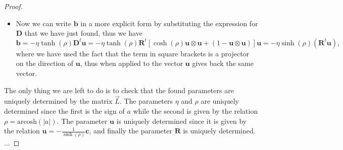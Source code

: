 \begin{proof}
\begin{itemize}
\[              \]
              since we know \(\alpha, \beta \neq 0\). Thus the inverse of the middle term is given by
              \[
                  \left[ 1 - \tanh^2(\rho) \mathbf{u} \otimes \mathbf{u} \right]^{-1} = (1 - \mathbf{u} \otimes \mathbf{u}) + \frac{1}{1 - \tanh^2(\rho)} \mathbf{u} \otimes \mathbf{u} = (1 - \mathbf{u} \otimes \mathbf{u}) + \cosh^2(\rho) \mathbf{u} \otimes \mathbf{u},
              \]
              where we have used the identity \(1 - \tanh^2(\rho) = \frac{1}{\cosh^2(\rho)}\).
              Hence we have
              \[
                  \mathbf{D} \mathbf{D}^t = (1 - \mathbf{u} \otimes \mathbf{u}) + \cosh^2(\rho) \mathbf{u} \otimes \mathbf{u}.
              \]
              It is not difficult to guess a solution for \(\mathbf{D}\) that satisfies this equation: imagine a matrix which has the same structure but different coefficients, which since the proectors are idempotent, when multiplied by its transposition will give the same structure but with the coefficients squared, thus we can write
              \[
                  \mathbf{D}_o = \left[ \cosh(\rho) \mathbf{u} \otimes \mathbf{u} + (1 - \mathbf{u} \otimes \mathbf{u}) \right] = \mathbf{D}_o^t,
              \]
              and if we now imagine a rotation matrix \(\mathbf{R} \in \mathrm{O}(3)\) and we write \(\mathbf{D} = \mathbf{D}_o \mathbf{R}\), then we have \(\mathbf{D}_o \mathbf{R} (D_o \mathbf{R})^t = \mathbf{D}_o \mathbf{R} \mathbf{R}^t \mathbf{D}_o^t = \mathbf{D}_o \mathbf{D}_o^t\). Hence we have found a solution for \(\mathbf{D}\) that satisfies the third equation, which is given by
              \[
                  \mathbf{D} = \left[ \cosh(\rho) \mathbf{u} \otimes \mathbf{u} + (1 - \mathbf{u} \otimes \mathbf{u}) \right] \mathbf{R}.
              \]
        \item Now we can write \(\mathbf{b}\) in a more explicit form by substituting the expression for \(\mathbf{D}\) that we have just found, thus we have
              \[
                  \mathbf{b} = -\eta \tanh(\rho) \mathbf{D}^t \mathbf{u} = -\eta \tanh(\rho) \mathbf{R}^t \left[ \cosh(\rho) \mathbf{u} \otimes \mathbf{u} + (1 - \mathbf{u} \otimes \mathbf{u}) \right] \mathbf{u} = -\eta \sinh(\rho) (\mathbf{R}^t \mathbf{u}),
              \]
              where we have used the fact that the term in square brackets is a projector on the direction of \(\mathbf{u}\), thus when applied to the vector \(\mathbf{u}\) gives back the same vector.
    \end{itemize}
    The only thing we are left to do is to check that the found parameters are uniquely determined by the matrix \(\vec{L}\). The parameters \(\eta\) and \(\rho\) are uniquely determined since the first is the sign of \(a\) while the second is given by the relation \(\rho = \text{arcosh}(\vert a \vert)\). The parameter \(\mathbf{u}\) is uniquely determined since it is given by the relation \(\mathbf{u} = -\frac{1}{\sinh(\rho)} \mathbf{c}\), and finally the parameter \(\mathbf{R}\) is uniquely determined. ...


\end{proof}
